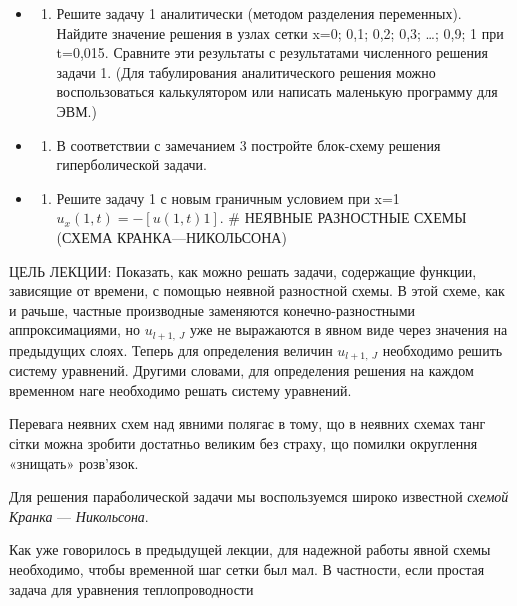 \documentclass[
  ukrainian,
]{article}
\providecommand{\tightlist}{%
  \setlength{\itemsep}{0pt}\setlength{\parskip}{0pt}}
\begin{document}
\begin{itemize}
\tightlist
\item
  \begin{enumerate}
  \def\labelenumi{\arabic{enumi}.}
  \setcounter{enumi}{1}
  \tightlist
  \item
    Решите задачу 1 аналитически (методом разделения переменных).
    Найдите значение решения в узлах сетки x=0; 0,1; 0,2; 0,3; \ldots;
    0,9; 1 при t=0,015. Сравните эти результаты с результатами
    численного решения задачи 1. (Для табулирования аналитического
    решения можно воспользоваться калькулятором или написать маленькую
    программу для ЭВМ.)
  \end{enumerate}
\item
  \begin{enumerate}
  \def\labelenumi{\arabic{enumi}.}
  \setcounter{enumi}{2}
  \tightlist
  \item
    В соответствии с замечанием 3 постройте блок-схему решения
    гиперболической задачи.
  \end{enumerate}
\item
  \begin{enumerate}
  \def\labelenumi{\arabic{enumi}.}
  \setcounter{enumi}{3}
  \tightlist
  \item
    Решите задачу 1 с новым граничным условием при x=1
    \(u_x(1, t) = -[u(1, t) 1].\) \# НЕЯВНЫЕ РАЗНОСТНЫЕ СХЕМЫ (СХЕМА
    КРАНКА---НИКОЛЬСОНА)
  \end{enumerate}
\end{itemize}

ЦЕЛЬ ЛЕКЦИИ: Показать, как можно решать задачи, содержащие функции,
зависящие от времени, с помощью неявной разностной схемы. В этой схеме,
как и рачьше, частные производные заменяются конечно-разностными
аппроксимациями, но \(u_{l+1,\ J}\) уже не выражаются в явном виде через
значения на предыдущих слоях. Теперь для определения величин
\(u_{l+1,\ J}\) необходимо решить систему уравнений. Другими словами,
для определения решения на каждом временном наге необходимо решать
систему уравнений.

Перевага неявних схем над явними полягає в тому, що в неявних схемах
танг сітки можна зробити достатньо великим без страху, що помилки
округлення «знищать» розв'язок.

Для решения параболической задачи мы воспользуемся широко известной
\emph{схемой Кранка} --- \emph{Никольсона}.

Как уже говорилось в предыдущей лекции, для надежной работы явной схемы
необходимо, чтобы временной шаг сетки был мал. В частности, если простая
задача для уравнения теплопроводности
\end{document}
